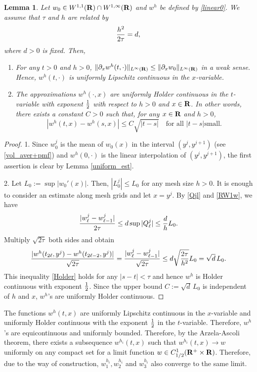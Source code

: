 \documentclass[11pt]{amsart}
\def\R{{\bf R}}
\def\R{{\bf R}}
\newtheorem{lemma}{Lemma}[section]
\begin{document}
\begin{lemma} \label{misc}
Let $w_0\in W^{1,1}(\R)\cap W^{1,\infty}(\R)$ and $w^h$ be defined by \eqref{linear0}. We assume that $\tau$ and $h$ are related by
$$
{h^2\over 2\tau}=d,
$$
where $d>0$ is fixed. Then,
\begin{enumerate}
 \item For any $t>0$ and $h>0$, $\|\partial_x w^h(t,\cdot)\|_{L^\infty(\R)} \le \|\partial_x w_0\|_{L^\infty(\R)}$ in a weak sense. Hence, $w^h(t,\cdot)$ is uniformly Lipschitz continuous in the $x$-variable.
 \item The approximations $w^h(\cdot,x)$ are uniformly Holder continuous in the $t$-variable with exponent ${1\over2}$ with respect to $h>0$ and $x\in\R$. In other words, there exists a constant $C>0$ such that, for any $x\in\R$ and $h>0$,
     \begin{equation}\label{Holder}
     |w^h(t,x)-w^h(s,x)|\le C\sqrt{|t-s|} \quad\text{for all } |t-s|\text{
     small}.
     \end{equation}
 \end{enumerate}
\end{lemma}
\begin{proof}
1. Since $w_0^j$ is the mean of $w_0(x)$ in the interval $(y^j,y^{j+1})$
(see \eqref{vol_aver+pmf}) and $w^h(0,\cdot)$ is the linear interpolation of
$(y^j,y^{j+1})$, the first assertion is clear by Lemma \ref{uniform_est}.

2. Let $L_0:=\sup |w_0'(x)|$. Then, $|L_0^{j}|\le L_0$ for any mesh size
$h>0$. It is enough to consider an estimate along mesh grids and let
$x=y^j$. By \eqref{Qjl} and \eqref{RW1w}, we have
$$
 \frac{|w^j_\ell - w^j_{\ell-1}|}{2\tau} \le d\sup|Q^j_{\ell}|\le {d\over
 h}L_0.
$$
Multiply $\sqrt{2\tau}$ both sides and obtain
$$
 {|w^h(t_{2\ell},y^j)-w^h(t_{2\ell-2},y^j)|\over\sqrt{2\tau}}=\frac{|w^j_\ell
 - w^j_{\ell-1}|}{\sqrt{2\tau}} \le d\sqrt{2\tau\over
 h^2}L_0=\sqrt{d}\,L_0.
$$
This inequality \eqref{Holder} holds for any $|s-t|<\tau$ and hence $w^h$ is Holder continuous with exponent ${1\over2}$. Since the upper bound $C:=\sqrt{d}\,L_0$ is independent of $h$ and $x$, $w^h$'s are uniformly Holder continuous.
\end{proof}

The functions $w^h(t,x)$ are uniformly Lipschitz continuous in the $x$-variable and uniformly Holder continuous with the exponent ${1\over2}$ in the $t$-variable. Therefore, $w^h$'s are equicontinuous and uniformly bounded. Therefore, by the Arzela-Ascoli theorem, there exists a subsequence $w^{h_i}(t,x)$ such that $w^{h_i}(t,x)\to w$ uniformly on any compact set for a limit function $w\in C^1_{1/2}(\R^+\times \R)$. Therefore, due to the way of construction, $w_1^{h_i},w_2^{h_i}$ and $w_3^{h_i}$ also converge to the same limit.
\end{document}
